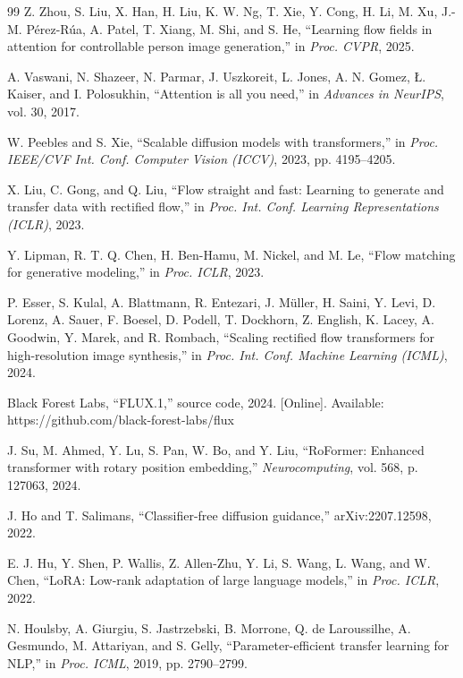 \begin{thebibliography}{99}
 Z. Zhou, S. Liu, X. Han, H. Liu, K. W. Ng, T. Xie, Y. Cong, H. Li, M. Xu, J.-M. Pérez-Rúa, A. Patel, T. Xiang, M. Shi, and S. He, ``Learning flow fields in attention for controllable person image generation,'' in \textit{Proc. CVPR}, 2025.

 A. Vaswani, N. Shazeer, N. Parmar, J. Uszkoreit, L. Jones, A. N. Gomez, Ł. Kaiser, and I. Polosukhin, ``Attention is all you need,'' in \textit{Advances in NeurIPS}, vol. 30, 2017.

 W. Peebles and S. Xie, ``Scalable diffusion models with transformers,'' in \textit{Proc. IEEE/CVF Int. Conf. Computer Vision (ICCV)}, 2023, pp. 4195--4205.

 X. Liu, C. Gong, and Q. Liu, ``Flow straight and fast: Learning to generate and transfer data with rectified flow,'' in \textit{Proc. Int. Conf. Learning Representations (ICLR)}, 2023.

 Y. Lipman, R. T. Q. Chen, H. Ben-Hamu, M. Nickel, and M. Le, ``Flow matching for generative modeling,'' in \textit{Proc. ICLR}, 2023.

 P. Esser, S. Kulal, A. Blattmann, R. Entezari, J. Müller, H. Saini, Y. Levi, D. Lorenz, A. Sauer, F. Boesel, D. Podell, T. Dockhorn, Z. English, K. Lacey, A. Goodwin, Y. Marek, and R. Rombach, ``Scaling rectified flow transformers for high-resolution image synthesis,'' in \textit{Proc. Int. Conf. Machine Learning (ICML)}, 2024.

 Black Forest Labs, ``FLUX.1,'' source code, 2024. [Online]. Available: https://github.com/black-forest-labs/flux

 J. Su, M. Ahmed, Y. Lu, S. Pan, W. Bo, and Y. Liu, ``RoFormer: Enhanced transformer with rotary position embedding,'' \textit{Neurocomputing}, vol. 568, p. 127063, 2024.

 J. Ho and T. Salimans, ``Classifier-free diffusion guidance,'' arXiv:2207.12598, 2022.

 E. J. Hu, Y. Shen, P. Wallis, Z. Allen-Zhu, Y. Li, S. Wang, L. Wang, and W. Chen, ``LoRA: Low-rank adaptation of large language models,'' in \textit{Proc. ICLR}, 2022.

 N. Houlsby, A. Giurgiu, S. Jastrzebski, B. Morrone, Q. de Laroussilhe, A. Gesmundo, M. Attariyan, and S. Gelly, ``Parameter-efficient transfer learning for NLP,'' in \textit{Proc. ICML}, 2019, pp. 2790--2799.


\end{thebibliography}
